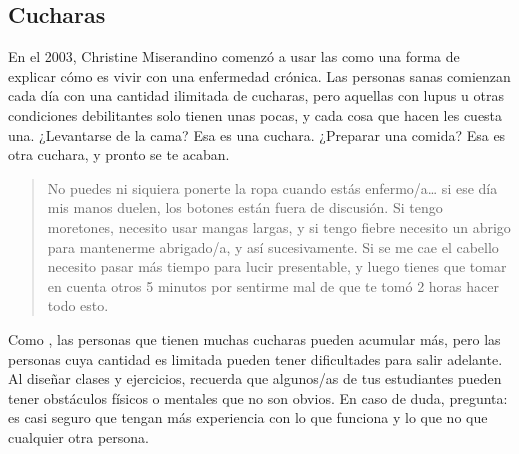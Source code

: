 \subsection*{Cucharas}

En el 2003,
Christine Miserandino comenzó a usar las 
como una forma de explicar cómo es vivir con una enfermedad crónica.
Las personas sanas comienzan cada día con una cantidad ilimitada de cucharas,
pero aquellas con lupus u otras condiciones debilitantes solo tienen unas pocas,
y cada cosa que hacen les cuesta una.
¿Levantarse de la cama?
Esa es una cuchara.
¿Preparar una comida?
Esa es otra cuchara, y pronto se te acaban.

\begin{quote}

  No puedes ni siquiera ponerte la ropa cuando estás enfermo/a{\dots}
  si ese día mis manos duelen, los botones están fuera de discusión.
  Si tengo moretones,
  necesito usar mangas largas,
  y si tengo fiebre necesito un abrigo para mantenerme abrigado/a, y así sucesivamente.
  Si se me cae el cabello necesito pasar más tiempo para lucir presentable,
  y luego tienes que tomar en cuenta otros 5 minutos por sentirme mal
  de que te tomó 2 horas hacer todo esto.

\end{quote}

Como ,
las personas que tienen muchas cucharas pueden acumular más,
pero las personas cuya cantidad es limitada pueden tener dificultades para salir adelante.
Al diseñar clases y ejercicios,
recuerda que algunos/as de tus estudiantes pueden tener obstáculos físicos o mentales que no son obvios.
En caso de duda, pregunta:
es casi seguro que tengan más experiencia con lo que funciona y lo que no que cualquier otra persona.


